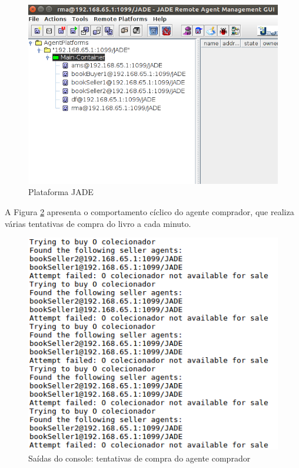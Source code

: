 \begin{figure}[H]
\centering
\includegraphics[scale=0.5]{figuras/contract-net/book-trading01}
\caption{Plataforma JADE}
\label{fig:book-trading01}
\end{figure}

A Figura \ref{fig:book-trading02} apresenta o comportamento cíclico do agente comprador, que realiza várias tentativas de compra do livro a cada minuto.

\begin{figure}[H]
\centering
\includegraphics[scale=0.55]{figuras/contract-net/book-trading02}
\caption{Saídas do console: tentativas de compra do agente comprador}
\label{fig:book-trading02}
\end{figure}

